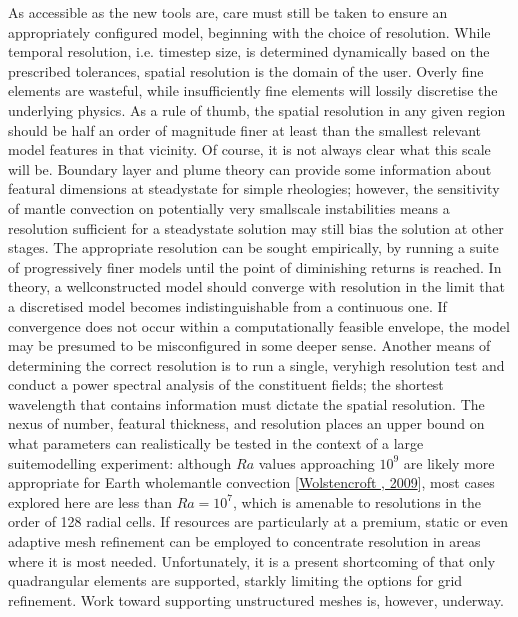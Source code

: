 \documentclass[letterpaper,10pt,english]{jupyterBook}
\begin{document}
\sphinxAtStartPar
As accessible as the new tools are, care must still be taken to ensure an appropriately configured model, beginning with the choice of resolution. While temporal resolution, i.e. timestep size, is determined dynamically based on the prescribed tolerances, spatial resolution is the domain of the user. Overly fine elements are wasteful, while insufficiently fine elements will lossily discretise the underlying physics. As a rule of thumb, the spatial resolution in any given region should be half an order of magnitude finer at least than the smallest relevant model features in that vicinity. Of course, it is not always clear  what this scale will be. Boundary layer and plume theory can provide some information about featural dimensions at steady\sphinxhyphen{}state for simple rheologies; however, the sensitivity of mantle convection on potentially very small\sphinxhyphen{}scale instabilities means a resolution sufficient for a steady\sphinxhyphen{}state solution may still bias the solution at other stages. The appropriate resolution can be sought empirically, by running a suite of progressively finer models until the point of diminishing returns is reached. In theory, a well\sphinxhyphen{}constructed model should converge with resolution in the limit that a discretised model becomes indistinguishable from a continuous one. If convergence does not occur within a computationally feasible envelope, the model may be presumed to be misconfigured in some deeper sense. Another means of determining the correct resolution is to run a single, very\sphinxhyphen{}high resolution test and conduct a power spectral analysis of the constituent fields; the shortest wavelength that contains information must dictate the spatial resolution. The nexus of  number, featural thickness, and resolution places an upper bound on what parameters can realistically be tested in the context of a large suite\sphinxhyphen{}modelling experiment: although \(Ra\) values approaching \(10^9\) are likely more appropriate for Earth whole\sphinxhyphen{}mantle convection {[}\hyperlink{cite.references:id8}{Wolstencroft , 2009}{]}, most cases explored here are less than \(Ra=10^7\), which is amenable to resolutions in the order of 128 radial cells. If resources are particularly at a premium, static or even adaptive mesh refinement can be employed to concentrate resolution in areas where it is most needed. Unfortunately, it is a present shortcoming of  that only quadrangular elements are supported, starkly limiting the options for grid refinement. Work toward supporting unstructured meshes is, however, underway.
\end{document}
